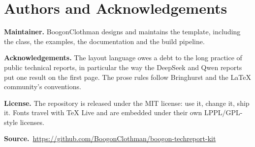 \section{Authors and Acknowledgements}
\label{app:authors}

\textbf{Maintainer.} BoogonClothman designs and maintains the template, including the
class, the examples, the documentation and the build pipeline.

\textbf{Acknowledgements.} The layout language owes a debt to the long practice of public
technical reports, in particular the way the DeepSeek and Qwen reports put one result on
the first page. The prose rules follow Bringhurst and the \LaTeX{} community's
conventions.\citep{bringhurst2013elements,mittelbach2023companion}

\textbf{License.} The repository is released under the MIT license: use it, change it,
ship it. Fonts travel with TeX Live and are embedded under their own LPPL/GPL-style
licenses.

\textbf{Source.}\ \url{https://github.com/BoogonClothman/boogon-techreport-kit}
